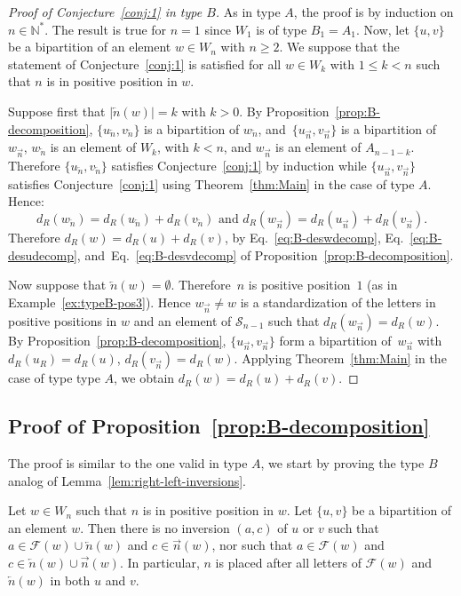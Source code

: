 \documentclass[ALCO,Unicode]{cedram}
\theoremstyle{definition}
\newcommand{\R}{{\overrightarrow{n}}}
\newcommand{\LL}{{\overleftarrow{n}}}
\newcommand{\dd}{d_R}
\newcommand{\F}{\mathcal{F}}
\begin{document}
\begin{proof}[Proof of Conjecture~\ref{conj:1} in type $B$] As in type $A$, the proof is  by induction on $n\in \mathbb N^*$. The result is true for $n=1$ since  $W_1$ is of type $B_1=A_1$. Now, let $\lbrace u, v \rbrace$ be a bipartition of an element $w \in W_n$ with $n \geq 2$. We suppose that the statement of Conjecture~\ref{conj:1} is satisfied for all $w\in W_k$ with $1 \leq k < n$ such that $n$ is in positive position in $w$. 

Suppose first that $|\LL(w)|=k$ with $k > 0$. By Proposition~\ref{prop:B-decomposition}, $\lbrace u_\LL, v_\LL \rbrace$ is a bipartition of $w_\LL$, and~$\lbrace u_\R, v_\R \rbrace$ is a bipartition of $w_\R$,  $w_\LL$ is an element of $W_k$, with $k < n$, and $w_\R$ is an element of $A_{n-1-k}$. Therefore $\lbrace u_\LL, v_\LL \rbrace$ satisfies Conjecture~\ref{conj:1} by induction while $\lbrace u_\R, v_\R \rbrace$ satisfies Conjecture~\ref{conj:1} using Theorem~\ref{thm:Main} in the case of type $A$. Hence: 
$$
\dd(w_\LL) = \dd(u_\LL) + \dd(v_\LL)\textrm{ and }\dd(w_\R) = \dd(u_\R) + \dd(v_\R).
$$ 
Therefore $\dd(w) = \dd(u) + \dd(v)$, by Eq.~\eqref{eq:B-deswdecomp}, Eq.~\eqref{eq:B-desudecomp}, and~Eq.~\eqref{eq:B-desvdecomp} of Proposition~\ref{prop:B-decomposition}.

Now suppose that $\LL(w)=\emptyset$. Therefore~$n$ is positive position~$1$ (as in Example~\ref{ex:typeB-pos3}). Hence $w_\R\not =w$ is a standardization of the letters in positive positions in $w$ and an element of $\mathcal S_{n-1}$ such that $\dd(w_\R) = \dd(w)$. By Proposition~\ref{prop:B-decomposition}, $\lbrace u_\R, v_\R \rbrace$ form a bipartition of~$w_\R$ with $\dd(u_R) = \dd(u)$, $\dd(v_\R) = \dd(w)$. Applying Theorem~\ref{thm:Main} in  the case of type type $A$, we obtain $\dd(w) = \dd(u) + \dd(v)$. 
\end{proof}


\subsection{Proof of Proposition~\ref{prop:B-decomposition}}

The proof is  similar to the one valid in type $A$, we start by proving the type $B$ analog of Lemma~\ref{lem:right-left-inversions}.

\begin{lemm}
\label{lem:B-right-left-inversions}
Let $w\in W_n$ such that $n$ is in positive position in $w$. Let $\lbrace u, v \rbrace$ be a bipartition of an element $w$. Then there is no inversion $(a,c)$ of $u$ or $v$ such that $a \in \F(w) \cup \LL(w)$ and $c \in \R(w)$, nor such that $a\in \F(w)$ and $c \in \LL(w) \cup \R(w)$. In particular, $n$ is placed after all letters of $\F(w)$ and $\LL(w)$ in both $u$ and $v$.
\end{lemm} 
\end{document}
